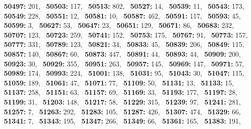 \textbf{50497:} 201,\allowbreak~ 
\textbf{50503:} 117,\allowbreak~ 
\textbf{50513:} 802,\allowbreak~ 
\textbf{50527:} 14,\allowbreak~ 
\textbf{50539:} 11,\allowbreak~ 
\textbf{50543:} 173,\allowbreak~ 
\textbf{50549:} 228,\allowbreak~ 
\textbf{50551:} 12,\allowbreak~ 
\textbf{50581:} 10,\allowbreak~ 
\textbf{50587:} 462,\allowbreak~ 
\textbf{50591:} 117,\allowbreak~ 
\textbf{50593:} 45,\allowbreak~ 
\textbf{50599:} 3,\allowbreak~ 
\textbf{50627:} 53,\allowbreak~ 
\textbf{50647:} 23,\allowbreak~ 
\textbf{50651:} 129,\allowbreak~ 
\textbf{50671:} 86,\allowbreak~ 
\textbf{50683:} 232,\allowbreak~ 
\textbf{50707:} 123,\allowbreak~ 
\textbf{50723:} 259,\allowbreak~ 
\textbf{50741:} 152,\allowbreak~ 
\textbf{50753:} 175,\allowbreak~ 
\textbf{50767:} 91,\allowbreak~ 
\textbf{50773:} 157,\allowbreak~ 
\textbf{50777:} 331,\allowbreak~ 
\textbf{50789:} 123,\allowbreak~ 
\textbf{50821:} 34,\allowbreak~ 
\textbf{50833:} 45,\allowbreak~ 
\textbf{50839:} 206,\allowbreak~ 
\textbf{50849:} 115,\allowbreak~ 
\textbf{50857:} 140,\allowbreak~ 
\textbf{50867:} 60,\allowbreak~ 
\textbf{50873:} 447,\allowbreak~ 
\textbf{50891:} 44,\allowbreak~ 
\textbf{50893:} 44,\allowbreak~ 
\textbf{50909:} 200,\allowbreak~ 
\textbf{50923:} 30,\allowbreak~ 
\textbf{50929:} 355,\allowbreak~ 
\textbf{50951:} 263,\allowbreak~ 
\textbf{50957:} 145,\allowbreak~ 
\textbf{50969:} 147,\allowbreak~ 
\textbf{50971:} 57,\allowbreak~ 
\textbf{50989:} 174,\allowbreak~ 
\textbf{50993:} 224,\allowbreak~ 
\textbf{51001:} 138,\allowbreak~ 
\textbf{51031:} 95,\allowbreak~ 
\textbf{51043:} 30,\allowbreak~ 
\textbf{51047:} 115,\allowbreak~ 
\textbf{51059:} 189,\allowbreak~ 
\textbf{51061:} 47,\allowbreak~ 
\textbf{51071:} 77,\allowbreak~ 
\textbf{51109:} 50,\allowbreak~ 
\textbf{51131:} 13,\allowbreak~ 
\textbf{51133:} 15,\allowbreak~ 
\textbf{51137:} 258,\allowbreak~ 
\textbf{51151:} 63,\allowbreak~ 
\textbf{51157:} 69,\allowbreak~ 
\textbf{51169:} 33,\allowbreak~ 
\textbf{51193:} 177,\allowbreak~ 
\textbf{51197:} 28,\allowbreak~ 
\textbf{51199:} 31,\allowbreak~ 
\textbf{51203:} 148,\allowbreak~ 
\textbf{51217:} 58,\allowbreak~ 
\textbf{51229:} 315,\allowbreak~ 
\textbf{51239:} 97,\allowbreak~ 
\textbf{51241:} 281,\allowbreak~ 
\textbf{51257:} 7,\allowbreak~ 
\textbf{51263:} 292,\allowbreak~ 
\textbf{51283:} 105,\allowbreak~ 
\textbf{51287:} 426,\allowbreak~ 
\textbf{51307:} 474,\allowbreak~ 
\textbf{51329:} 66,\allowbreak~ 
\textbf{51341:} 7,\allowbreak~ 
\textbf{51343:} 195,\allowbreak~ 
\textbf{51347:} 266,\allowbreak~ 
\textbf{51349:} 66,\allowbreak~ 
\textbf{51361:} 165,\allowbreak~ 
\textbf{51383:} 191,\allowbreak~ 

